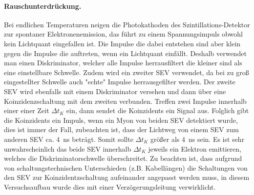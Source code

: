 \paragraph{Rauschunterdrückung.}
Bei endlichen Temperaturen neigen die Photokathoden des Szintillations-Detektor zur spontaner Elektronenemission, 
das führt zu einem Spannungsimpuls obwohl kein Lichtquant eingefallen ist. Die Impulse die dabei entstehen sind 
aber klein gegen die Impulse die auftreten, wenn ein Lichtquant einfällt. Deshalb verwendet man einen 
Diskriminator, welcher alle Impulse herrausfiltert die kleiner sind als eine einstellbare Schwelle. Zudem wird 
ein zweiter SEV verwendet, da bei zu groß eingestellter Schwelle auch "echte" Impulse herrausgefilter werden. 
Der zweite SEV wird ebenfalls mit einem Diskriminator versehen und dann über eine Koinzidenzschaltung mit dem 
zweiten verbunden. Treffen zwei Impulse innerhalb einer einer Zeit $\Delta t_K$ ein, dann sendet die 
Koinzidents ein Signal aus. Folglich gibt die Koinzidents ein Impuls, wenn ein Myon von beiden SEV detektiert 
wurde, dies ist immer der Fall, zubeachten ist, dass der Lichtweg von einem SEV zum anderen SEV ca. 
\SI{4}{\nano\second} beträgt. Somit sollte $\Delta t_K$ größer als \SI{4}{\nano\second} sein. Es ist sehr 
unwahrscheinlich das beide SEV innerhalb $\Delta t_K$ jeweils ein Elektron emittieren, welches die 
Diskriminatorschwelle überschreitet. Zu beachten ist, dass aufgrund von schaltungstechnischen Unterschieden 
(z.B. Kabellängen) die Schaltungen von den SEV zur Koinzidentzschaltung aufeinander angepasst werden muss, in 
diesem Versuchsaufbau wurde dies mit einer Verzögerungsleitung verwirklicht.



